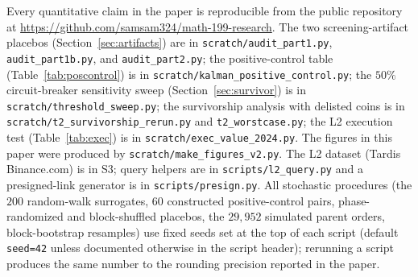 \documentclass[11pt]{article}
\begin{document}
Every quantitative claim in the paper is reproducible from the public repository at
\url{https://github.com/samsam324/math-199-research}. The two screening-artifact placebos
(Section~\ref{sec:artifacts}) are in \texttt{scratch/audit\_part1.py},
\texttt{audit\_part1b.py}, and \texttt{audit\_part2.py}; the positive-control table
(Table~\ref{tab:poscontrol}) is in \texttt{scratch/kalman\_positive\_control.py}; the
$50\%$ circuit-breaker sensitivity sweep (Section~\ref{sec:survivor}) is in
\texttt{scratch/threshold\_sweep.py}; the survivorship analysis with delisted coins is in
\texttt{scratch/t2\_survivorship\_rerun.py} and \texttt{t2\_worstcase.py}; the L2 execution
test (Table~\ref{tab:exec}) is in \texttt{scratch/exec\_value\_2024.py}. The figures in
this paper were produced by \texttt{scratch/make\_figures\_v2.py}. The L2 dataset
(Tardis Binance.com) is in S3; query helpers are in
\texttt{scripts/l2\_query.py} and a presigned-link generator is in
\texttt{scripts/presign.py}. All stochastic procedures (the $200$ random-walk surrogates,
$60$ constructed positive-control pairs, phase-randomized and block-shuffled placebos, the
$29{,}952$ simulated parent orders, block-bootstrap resamples) use fixed seeds set at the
top of each script (default \texttt{seed=42} unless documented otherwise in the script
header); rerunning a script produces the same number to the rounding precision reported in
the paper.
\end{document}
